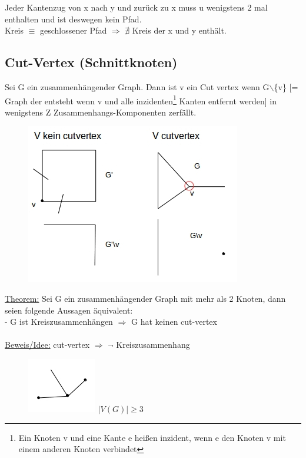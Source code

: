 Jeder Kantenzug von x nach y und zurück zu x muss u wenigstens 2 mal enthalten und ist deswegen kein Pfad.\\
Kreis $\equiv$ geschlossener Pfad $\Rightarrow$ $\nexists$ Kreis der x und y enthält.

\subsection{Cut-Vertex (Schnittknoten)}
Sei G ein zusammenhängender Graph. Dann ist v ein Cut vertex wenn G$\backslash$\{v\} [= Graph der entsteht wenn v und alle inzidenten\footnote{Ein Knoten v und eine Kante e heißen inzident, wenn e den Knoten v mit einem anderen Knoten verbindet} Kanten entfernt werden] in wenigstens Z Zusammenhangs-Komponenten zerfällt.
\begin{figure}[htp]
\centering
\includegraphics[scale=1.00]{lectures/161021/pix/pic3.jpg}
\end{figure}

\underline{Theorem:} Sei G ein zusammenhängender Graph mit mehr als 2 Knoten, dann seien folgende Aussagen äquivalent:\\
 - G ist Kreiszusammenhängen $\Rightarrow$ G hat keinen cut-vertex
\\\\
\underline{Beweis/Idee:}
cut-vertex $\Rightarrow$ $\neg$ Kreiszusammenhang
\begin{figure}[htp]
\centering
\includegraphics[scale=1.00]{lectures/161021/pix/pic4.jpg}
$|V(G)| \geq 3$
\end{figure}

